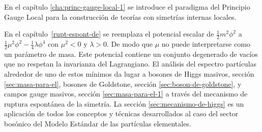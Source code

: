 
En el capítulo \ref{cha:princ-gauge-local-1} se introduce el paradigma del Principio Gauge Local para la construcción de teorías con simetrías internas locales.

En el capítulo~\ref{rupt-espont-de} se %
reemplaza el potencial escalar de $\frac{1}{2}m^2\phi^2$ a $\frac{1}{2}\mu^2\phi^2-\frac{1}{4}\lambda\phi^4$ con $\mu^2\lt 0$ y $\lambda\gt 0$. De modo que $\mu$ no puede interpretarse como un parámetro de masa. Este potencial contiene un conjunto degenerado de vacíos que no respetan la invarianza del Lagrangiano. El análisis del espectro partículas alrededor de uno de estos mínimos da lugar a bosones de Higgs masivos, sección \ref{sec:masa-para-el}, bosones de Goldstone, sección \ref{sec:boson-de-goldstone}, y campos gauge masivos, sección \ref{sec:masa-para-el-1} a través del mecanismo de ruptura espontánea de la simetría. La sección \ref{sec:mecanismo-de-higgs} es un aplicación de todos los conceptos y técnicas desarrollados al caso del sector bosónico del Modelo Estándar de las partículas elementales. 

